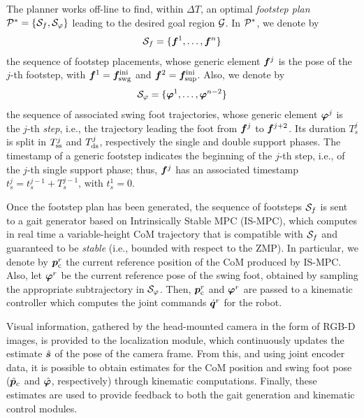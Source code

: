 The planner works off-line to find, within $\Delta T$, an optimal \textit{footstep plan} ${\cal P}^\ast = \{ {\cal S}_f, {\cal S}_\varphi \}$ leading to the desired goal region $\cal G$. In ${\cal P}^*$, we denote by
\begin{equation*}
    {\cal S}_f = \{{\bm{f}}^1, \dots, {\bm{f}}^n\}
\end{equation*}
the sequence of footstep placements, whose generic element ${\bm{f}}^j$ is the pose of the $j$-th footstep, with ${\bm{f}}^1 = {\bm{f}}_{\rm swg}^{\rm ini}$ and ${\bm{f}}^2 = {\bm{f}}_{\rm sup}^{\rm ini}$. Also, we denote by
\begin{equation*}
    {\cal S}_\varphi = \{{\bm{\varphi}}^1, \dots, {\bm{\varphi}}^{n-2}\}
\end{equation*} 
the sequence of associated swing foot trajectories, whose generic element ${\bm{\varphi}}^j$ is the $j$-th {\em step}, i.e., the trajectory leading the foot from ${\bm{f}}^{j}$ to ${\bm{f}}^{j+2}$. Its duration $T_s^j$ is split in $T_{\rm ss}^j$ and $T_{\rm ds}^j$, respectively the single and double support phases. 
The timestamp of a generic footstep indicates the beginning of the $j$-th step, i.e., of the $j$-th single support phase; thus, ${\bm{f}}^{j}$ has an associated timestamp $t_s^{j} = t_s^{j-1} + T_s^{j-1}$, with $t_s^{1}=0$.

Once the footstep plan has been generated, the sequence of footsteps ${\cal S}_{f}$ is sent to a gait generator based on Intrinsically Stable MPC (IS-MPC), which computes in real time a variable-height CoM trajectory that is compatible with ${\cal S}_{f}$ and guaranteed to be {\em stable} (i.e., bounded with respect to the ZMP). In particular, we denote by ${\bm{p}}_{\rm c}^r$ the current reference position of the CoM produced by IS-MPC. Also, let ${\bm{\varphi}}^r$ be the current reference pose of the swing foot, obtained by sampling the appropriate subtrajectory in ${\cal S}_{\varphi}$. Then, ${\bm{p}}_{\rm c}^r$ and ${\bm{\varphi}}^r$ are passed to a kinematic controller which computes the joint commands $\dot{{\bm{q}}}^r$ for the robot.

Visual information, gathered by the head-mounted camera in the form of RGB-D images, is provided to the localization module, which continuously updates the estimate $\hat{{\bm{s}}}$ of the pose of the camera frame.
From this, and using joint encoder data, it is possible to obtain estimates for the CoM position and swing foot pose ($\hat {{\bm{p}}}_c$ and $\hat {{\bm{\varphi}}}$, respectively) through kinematic computations. Finally, these estimates are used to provide feedback to both the gait generation and kinematic control modules.

